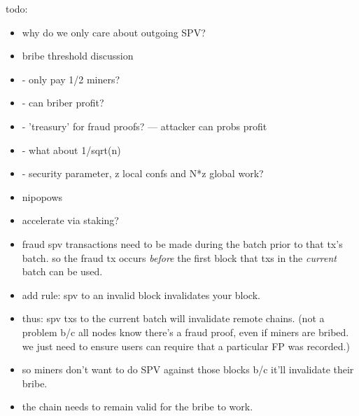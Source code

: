 
\begin{draftonly}





todo:

\begin{itemize}
    \item why do we only care about outgoing SPV?
    \item bribe threshold discussion
    \item - only pay 1/2 miners?
    \item - can briber profit?
    \item - 'treasury' for fraud proofs? --- attacker can probs profit
    \item - what about 1/sqrt(n)
    \item - security parameter, z local confs and N*z global work?
    \item nipopows
    \item accelerate via staking?
    \item fraud spv transactions need to be made during the batch prior to that tx's batch. so the fraud tx occurs \emph{before} the first block that txs in the \emph{current} batch can be used.
    \item add rule: spv to an invalid block invalidates your block.
    \item thus: spv txs to the current batch will invalidate remote chains. (not a problem b/c all nodes know there's a fraud proof, even if miners are bribed. we just need to ensure users can require that a particular FP was recorded.)
    \item so miners don't want to do SPV against those blocks b/c it'll invalidate their bribe.
    \item the chain needs to remain valid for the bribe to work.
\end{itemize}



\end{draftonly}
